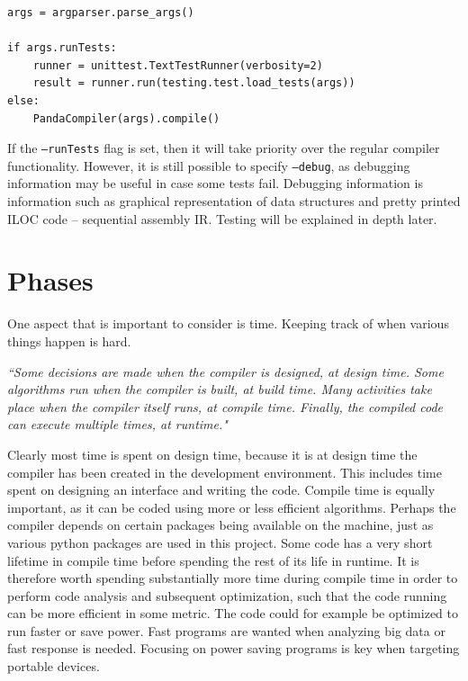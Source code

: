 \begin{verbatim}
args = argparser.parse_args()

if args.runTests:
    runner = unittest.TextTestRunner(verbosity=2)
    result = runner.run(testing.test.load_tests(args))
else:
    PandaCompiler(args).compile()
\end{verbatim}

If the \texttt{--runTests} flag is set, then it will take priority over the regular compiler functionality. However, it is still possible to specify \texttt{--debug}, as debugging information may be useful in case some tests fail. Debugging information is information such as graphical representation of data structures and pretty printed ILOC code -- sequential assembly IR. Testing will be explained in depth later.

\chapter{Phases}
One aspect that is important to consider is time. Keeping track of when various things happen is hard. 

\begin{displayquote}
    \textit{``Some decisions are made when the compiler is designed, at design time. Some algorithms run when the compiler is built, at build time. Many activities take place when the compiler itself runs, at compile time. Finally, the compiled code can execute multiple times, at runtime."}
\end{displayquote}
\hspace*{}

Clearly most time is spent on design time, because it is at design time the compiler has been created in the development environment. This includes time spent on designing an interface and writing the code. Compile time is equally important, as it can be coded using more or less efficient algorithms. Perhaps the compiler depends on certain packages being available on the machine, just as various python packages are used in this project. Some code has a very short lifetime in compile time before spending the rest of its life in runtime. It is therefore worth spending substantially more time during compile time in order to perform code analysis and subsequent optimization, such that the code running can be more efficient in some metric. The code could for example be optimized to run faster or save power. Fast programs are wanted when analyzing big data or fast response is needed. Focusing on power saving programs is key when targeting portable devices. 

